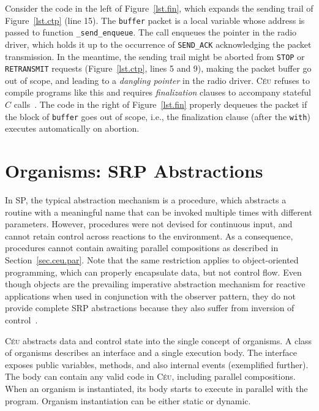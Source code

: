 \documentclass{acm_proc_article-sp}
\newcommand{\CEU}{\textsc{C\'{e}u}\xspace}
\newcommand{\code}[1] {{\small{\texttt{#1}}}}
\newcommand{\1}{\;}
\newcommand{\2}{\;\;}
\newcommand{\3}{\;\;\;}
\newcommand{\5}{\;\;\;\;\;}
\begin{document}
Consider the code in the left of Figure~\ref{lst.fin}, which expands the 
sending trail of Figure~\ref{lst.ctp} (line 15).
%
The \code{buffer} packet is a local variable whose address is passed to 
function \code{\_send\_enqueue}.
The call enqueues the pointer in the radio driver, which holds it up to the 
occurrence of \code{SEND\_ACK} acknowledging the packet transmission.
%
In the meantime, the sending trail might be aborted from \code{STOP} or 
\code{RETRANSMIT} requests (Figure~\ref{lst.ctp}, lines 5 and 9), making the 
packet buffer go out of scope, and leading to a \emph{dangling pointer} in the 
radio driver.
%
\CEU refuses to compile programs like this and requires \emph{finalization} 
clauses to accompany stateful $C$ calls~\cite{ceu.sensys13}.
The code in the right of Figure~\ref{lst.fin} properly dequeues the packet if
the block of \code{buffer} goes out of scope, i.e., the finalization clause 
(after the \code{with}) executes automatically on abortion.

\section{Organisms: SRP Abstractions}
\label{sec.orgs}

%
In SP, the typical abstraction mechanism is a procedure, which abstracts a 
routine with a meaningful name that can be invoked multiple times with 
different parameters.
%
However, procedures were not devised for continuous input, and cannot retain 
control across reactions to the environment.
As a consequence, procedures cannot contain awaiting parallel compositions as
described in Section~\ref{sec.ceu.par}.
%
Note that the same restriction applies to object-oriented programming, which 
can properly encapsulate data, but not control flow.
Even though objects are the prevailing imperative abstraction mechanism for 
reactive applications when used in conjunction with the observer pattern, they 
do not provide complete SRP abstractions because they also suffer from 
inversion of control~\cite{rp.rescala}.

\CEU abstracts data and control state into the single concept of organisms.
%
A class of organisms describes an interface and a single execution body.
The interface exposes public variables, methods, and also internal events 
(exemplified further).
The body can contain any valid code in \CEU, including parallel compositions.
When an organism is instantiated, its body starts to execute in parallel with 
the program.
Organism instantiation can be either static or dynamic.
\end{document}
